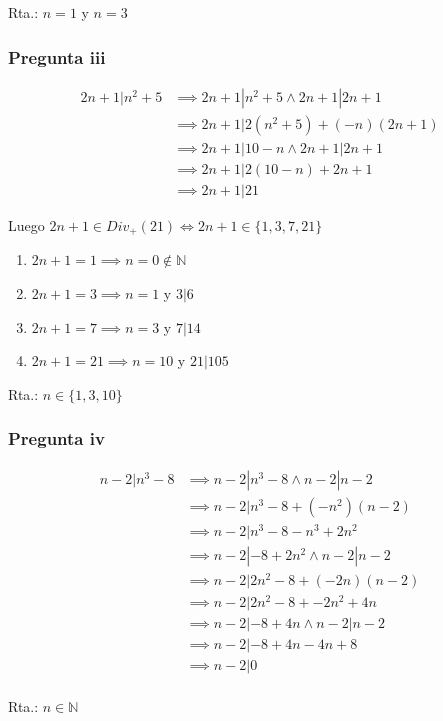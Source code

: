 Rta.: $n = 1$ y $n = 3$

\subsubsection{Pregunta iii}
\begin{align*}
    2n+1 | n^2+5 &\implies 2n+1 | n^2+5 \wedge 2n+1 | 2n+1 \\
    &\implies 2n+1 | 2(n^2+5) + (-n)(2n+1) \\
    &\implies 2n+1 | 10-n \wedge 2n+1 | 2n+1 \\
    &\implies 2n+1 | 2(10-n) + 2n+1 \\
    &\implies 2n+1 | 21
\end{align*}
  
Luego $ 2n+1 \in Div_+(21) \iff 2n+1 \in \{ 1,3,7,21 \}$

\begin{enumerate}[label=(\alph*)]
    \item $2n+1 = 1 \implies n = 0 \not \in \mathbb{N}$
    \item $2n+1 = 3 \implies n = 1 $ y $ 3|6 $
    \item $2n+1 = 7 \implies n = 3 $ y $ 7|14 $
    \item $2n+1 = 21 \implies n = 10 $ y $ 21|105 $
\end{enumerate}

Rta.: $ n \in \{ 1,3,10 \} $

\subsubsection{Pregunta iv}
\begin{align*}
    n-2 | n^3-8 &\implies n-2 | n^3-8 \wedge n-2 | n-2 \\
    &\implies n-2 | n^3-8 +(-n^2)(n-2) \\
    &\implies n-2 | n^3 - 8 -n^3 + 2n^2 \\
    &\implies n-2 | - 8 + 2n^2 \wedge n-2 | n-2 \\
    &\implies n-2 | 2n^2 - 8 + (-2n)(n-2) \\
    &\implies n-2 | 2n^2 - 8 + -2n^2 + 4n \\
    &\implies n-2 | - 8 + 4n \wedge n-2 | n-2 \\
    &\implies n-2 | - 8 + 4n -4n+8 \\
    &\implies n-2 | 0 \\
\end{align*}

Rta.: $ n \in \mathbb{N} $

